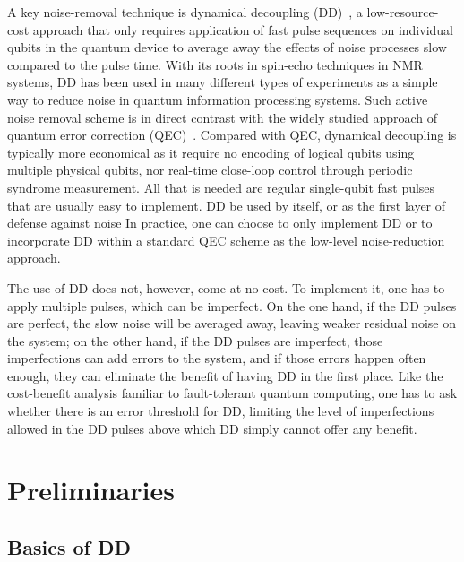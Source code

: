\documentclass[pra,reprint,superscriptaddress]{revtex4-2}
\begin{document}
A key noise-removal technique is dynamical decoupling (DD)~\cite{viola1999dynamical,duan1998pulse,zanardi1999symmetrizing,khodjasteh2005fault,khodjasteh2007performance,viola2006randomized,uhrig2007keeping,pasini2010optimized,wang2011protection,ng2011combining,kuo2011quadratic}, a low-resource-cost approach that only requires application of fast pulse sequences on individual qubits in the quantum device to average away the effects of noise processes slow compared to the pulse time. With its roots in spin-echo techniques in NMR systems, DD has been used in many different types of experiments as a simple way to reduce noise in quantum information processing systems. Such active noise removal scheme is in direct contrast with the widely studied approach of quantum error correction (QEC)~\cite{Lida2013book}.
Compared with QEC,  dynamical decoupling is typically more economical as it
require no encoding of logical qubits using multiple physical qubits, nor real-time close-loop control through periodic syndrome measurement. All that is needed are regular single-qubit fast pulses that are usually easy to implement. DD be used by itself, or as the first layer of defense against noise In practice, one can choose to only implement DD or to incorporate DD within a standard QEC scheme as the low-level noise-reduction approach. 

The use of DD does not, however, come at no cost. To implement it, one has to apply multiple pulses, which can be imperfect. On the one hand, if the DD pulses are perfect, the slow noise will be averaged away, leaving weaker residual noise on the system; on the other hand, if the DD pulses are imperfect, those imperfections can add errors to the system, and if those errors happen often enough, they can eliminate the benefit of having DD in the first place. Like the cost-benefit analysis familiar to fault-tolerant quantum computing, one has to ask whether there is an error threshold for DD, limiting the level of imperfections allowed in the DD pulses above which DD simply cannot offer any benefit. 

\bigskip
\noindent{}



\newpage

\section{Preliminaries}
\subsection{Basics of DD}
\end{document}
